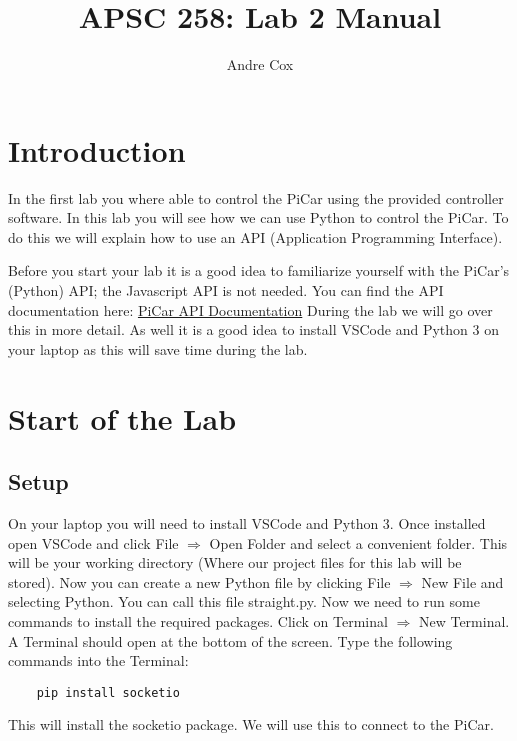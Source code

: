 \documentclass[11pt]{report}
\title{APSC 258: Lab 2 Manual}
\author{Andre Cox}
\begin{document}
\maketitle
\tableofcontents

\clearpage

\chapter{Introduction}
In the first lab you where able to control the PiCar using the provided
controller software. In this lab you will see how we can use Python to control
the PiCar. To do this we will explain how to use an API (Application
Programming Interface).


Before you start your lab it is a good idea to familiarize yourself with the
PiCar's (Python) API; the Javascript API is not needed. You can find the API
documentation here:
\href{https://github.com/PiCarV/Car-Software/wiki/Pi-Car-V-API-Documentation}{PiCar
    API Documentation} During the lab we will go over this in more detail. As well it is a good idea to install VSCode and Python 3 on your laptop as this will save time during the lab.

\chapter{Start of the Lab}
\section{Setup}
On your laptop you will need to install VSCode and Python 3. Once installed
open VSCode and click File $\Rightarrow$ Open Folder and select a convenient
folder. This will be your working directory (Where our project files for this
lab will be stored). Now you can create a new Python file by clicking File
$\Rightarrow$ New File and selecting Python. You can call this file
straight.py. Now we need to run some commands to install the required packages.
Click on Terminal $\Rightarrow$ New Terminal. A Terminal should open at the
bottom of the screen. Type the following commands into the Terminal:
\begin{verbatim}
    pip install socketio 
    \end{verbatim}
This will install the socketio package. We will use this to connect to the
PiCar.
\end{document}
